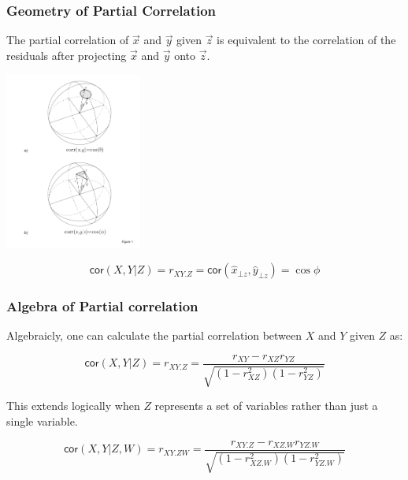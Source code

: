 \documentclass{beamer}
\begin{document}
\begin{frame}
  \frametitle{Geometry of Partial Correlation}

The partial correlation of $\vec{x}$ and $\vec{y}$ given $\vec{z}$ is equivalent to the correlation of the residuals after projecting $\vec{x}$ and $\vec{y}$ onto $\vec{z}$.

\begin{center}
\includegraphics[width=4.5cm]{partial-corr-sphere.pdf}
\end{center}
\[
\mathsf{cor}(X,Y|Z) = r_{XY.Z} = \mathsf{cor}(\widehat{x}_{\bot z},\widehat{y}_{\bot z}) = \cos \phi
\]


\end{frame}


\begin{frame}
  \frametitle{Algebra of Partial correlation}

Algebraicly, one can calculate the partial correlation between $X$ and $Y$ given $Z$ as:

\[
\mathsf{cor}(X,Y|Z) = r_{XY.Z} = \frac{r_{XY} - r_{XZ}r_{YZ}}{\sqrt{(1-r_{XZ}^2)(1-r_{YZ}^2)}}
\]

This extends logically when $Z$ represents a set of variables rather than just a single variable.

\[
\mathsf{cor}(X,Y|Z,W) = r_{XY.ZW} = \frac{r_{XY.Z} - r_{XZ.W}r_{YZ.W}}{\sqrt{(1-r_{XZ.W}^2)(1-r_{YZ.W}^2)}}
\]

\end{frame}
\end{document}
